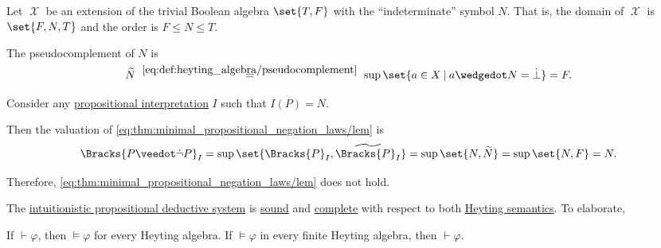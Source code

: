 \begin{example}\label{ex:heyting_semantics_lem_counterexample}
  Let \( \mscrX \) be an extension of the trivial Boolean algebra \( \set{ T, F } \) with the \enquote{indeterminate} symbol \( N \). That is, the domain of \( \mscrX \) is \( \set{ F, N, T } \) and the order is \( F \leq N \leq T \).

  The pseudocomplement of \( N \) is
  \begin{equation*}
    \widetilde{N}
    \reloset {\eqref{eq:def:heyting_algebra/pseudocomplement}} =
    \sup\set{ a \in X \given a \synwedge N = \synbot }
    =
    F.
  \end{equation*}

  Consider any \hyperref[def:propositional_valuation]{propositional interpretation} \( I \) such that \( I(P) = N \).

  Then the valuation of \eqref{eq:thm:minimal_propositional_negation_laws/lem} is
  \begin{equation*}
    \Bracks{P \synvee \synneg P}_I
    =
    \sup\set{ \Bracks{P}_I, \widetilde{\Bracks{P}_I} }
    =
    \sup\set{ N, \widetilde{N} }
    =
    \sup\set{ N, F }
    =
    N.
  \end{equation*}

  Therefore, \eqref{eq:thm:minimal_propositional_negation_laws/lem} does not hold.
\end{example}

\begin{theorem}\label{thm:intuitionistic_propositional_logic_is_sound_and_complete}
  The \hyperref[def:intuitionistic_propositional_deductive_systems]{intuitionistic propositional deductive system} is \hyperref[def:derivability_and_satisfiability/soundness]{sound} and \hyperref[def:derivability_and_satisfiability/completeness]{complete} with respect to both \hyperref[def:propositional_heyting_algebra_semantics]{Heyting semantics}. To elaborate,
  \begin{thmenum}
     If \( \vdash \varphi \), then \( \vDash \varphi \) for every Heyting algebra.
     If \( \vDash \varphi \) in every finite Heyting algebra, then \( \vdash \varphi \).
  \end{thmenum}
\end{theorem}

